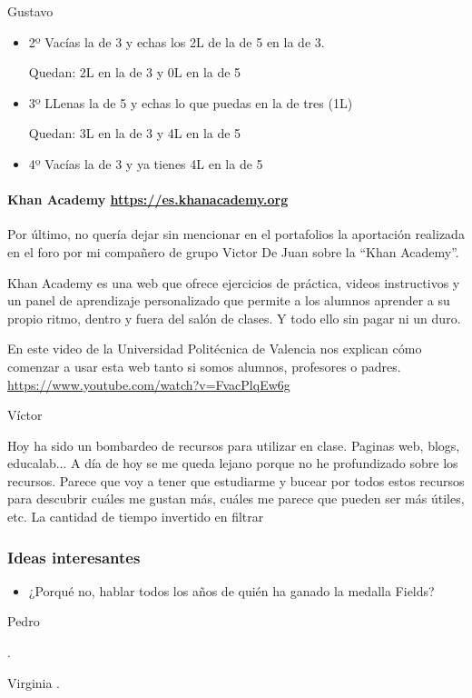 \begin{opin}{\guscolor}{Gustavo}
\begin{itemize}
Quedan 3L en la de 3 y 2L en la de 5

\item 2º Vacías la de 3 y echas los 2L de la de 5 en la de 3.  

Quedan: 2L en la de 3 y 0L en la de 5

\item 3º LLenas la de 5 y echas lo que puedas en la de tres (1L)  

Quedan: 3L en la de 3 y 4L en la de 5

\item 4º Vacías la de 3 y ya tienes 4L en la de 5 
\end{itemize}

\paragraph{Khan Academy \url{https://es.khanacademy.org}}
Por último, no quería dejar sin mencionar en el portafolios la aportación realizada en el foro  por mi compañero de grupo Victor De Juan sobre la “Khan Academy”.

Khan Academy es una web que ofrece ejercicios de práctica, videos instructivos y un panel de aprendizaje personalizado que permite a los alumnos aprender a su propio ritmo, dentro y fuera del salón de clases. Y todo ello sin pagar ni un duro.

En este video de la Universidad Politécnica de Valencia nos explican cómo comenzar a usar esta web tanto si somos alumnos, profesores o padres. \url{https://www.youtube.com/watch?v=FvacPlqEw6g}

 


\end{opin}

\begin{opin}{\victorcolor}{Víctor}

Hoy ha sido un bombardeo de recursos para utilizar en clase. Paginas web, blogs, educalab... 
%
A día de hoy se me queda lejano porque no he profundizado sobre los recursos. 
%
Parece que voy a tener que estudiarme y bucear por todos estos recursos para descubrir cuáles me gustan más, cuáles me parece que pueden ser más útiles, etc.
%
La cantidad de tiempo invertido en filtrar 


\subsubsection{Ideas interesantes}

\begin{itemize}
	\item ¿Porqué no, hablar todos los años de quién ha ganado la medalla Fields?
\end{itemize}

\end{opin}

\begin{opin}{\pedrocolor}{Pedro}

.


\end{opin}

\begin{opin}{\virgicolor}{Virginia}
.


\end{opin}
